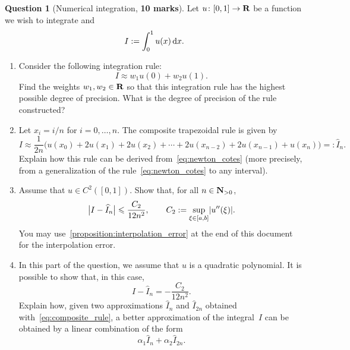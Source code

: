 \documentclass[11pt]{article}
\theoremstyle{definition}
\newtheorem{question}{Question}
\theoremstyle{remark}
\theoremstyle{plain}%
\begin{document}
\newpage
\begin{question}
    [Numerical integration, \textbf{10 marks}]
    Let $u \colon [0, 1] \to \mathbf R$ be a function we wish to integrate and
    \[
        I := \int_{0}^{1} u(x) \, \mathrm d x.
    \]
    \begin{enumerate}
        \item
        Consider the following integration rule:
        \begin{equation}
            \label{eq:newton_cotes}
            I\approx w_1 u(0) + w_2 u(1).
        \end{equation}
        Find the weights $w_1, w_2 \in \mathbf R$ so that this integration rule has the highest possible degree of precision.
        What is the degree of precision of the rule constructed?


        \item
            Let $x_i = i/n$ for $i = 0, \dotsc, n$.
            The composite trapezoidal rule is given by
            \begin{equation}
                \label{eq:composite_rule}
                I
                \approx \frac{1}{2n} \bigl( u(x_0) + 2 u(x_1) + 2 u(x_2) + \dotsb + 2 u(x_{n-2}) + 2 u(x_{n-1}) + u(x_n) \bigr) =: \widehat I_n.
            \end{equation}
            Explain how this rule can be derived from~\eqref{eq:newton_cotes} (more precisely,
            from a generalization of the rule~\eqref{eq:newton_cotes} to any interval).

        \item
            Assume that $u \in C^2([0, 1])$.
            Show that, for all $n \in \mathbf N_{>0}$,
            \begin{equation}
                \label{eq:error_bound_trapezoidal}
                \bigl\lvert I - \widehat I_n \bigr\rvert
                \leq \frac{C_2}{12 n^2},
                \qquad
                C_2 := \sup_{\xi \in [a, b]} \abs*{u''(\xi)}.
            \end{equation}
            You may use~\cref{proposition:interpolation_error} at the end of this document for the interpolation error.
        \item
        \mymark
        In this part of the question, we assume that $u$ is a quadratic polynomial.
        It is possible to show that, in this case,
        \[
             I - \widehat I_n = - \frac{C_2}{12 n^2}.
        \]
        Explain how, given two approximations $\widehat I_n$ and $\widehat I_{2n}$ obtained with~\eqref{eq:composite_rule},
        a better approximation of the integral~$I$ can be obtained by a linear combination of the form
        \[
            \alpha_1 \widehat I_n + \alpha_2 \widehat I_{2n}.
        \]


\end{enumerate}
\end{question}
\end{document}
